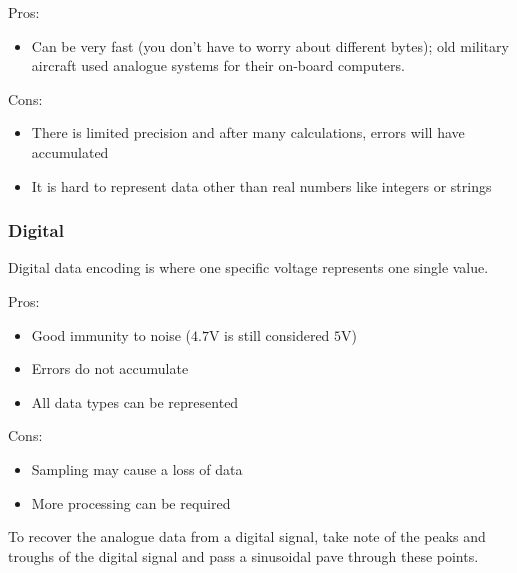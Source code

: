 \medskip
\begin{minipage}[t]{0.45\linewidth}
	Pros:
	\begin{itemize}
		\item Can be very fast (you don't have to worry about different bytes); old military aircraft used analogue systems for their on-board computers.
	\end{itemize}
\end{minipage}
\hfill
\begin{minipage}[t]{0.45\linewidth}
	Cons:
	\begin{itemize}
		\item There is limited precision and after many calculations, errors will have accumulated
		\item It is hard to represent data other than real numbers like integers or strings
	\end{itemize}
\end{minipage}

\subsubsection{Digital}\label{ssub:digital}

Digital data encoding is where one specific voltage represents one single value.

\medskip
\begin{minipage}[t]{0.45\linewidth}
	Pros:
	\begin{itemize}
		\item Good immunity to noise (\(4.7\)V is still considered \(5\)V)
		\item Errors do not accumulate
		\item All data types can be represented
	\end{itemize}
\end{minipage}
\hfill
\begin{minipage}[t]{0.45\linewidth}
	Cons:
	\begin{itemize}
		\item Sampling may cause a loss of data
		\item More processing can be required
	\end{itemize}
\end{minipage}

\begin{note}
	To recover the analogue data from a digital signal, take note of the peaks and troughs of the digital signal and pass a sinusoidal pave through these points.
\end{note}

